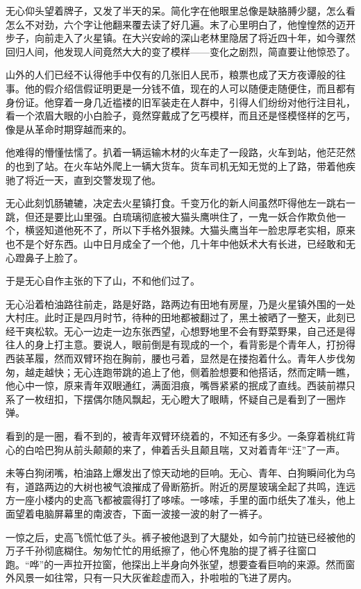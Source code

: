 无心仰头望着牌子，又发了半天的呆。简化字在他眼里总像是缺胳膊少腿，怎么看怎么不对劲，六个字让他翻来覆去读了好几遍。末了心里明白了，他惶惶然的迈开步子，向前走入了火星镇。在大兴安岭的深山老林里隐居了将近四十年，如今骤然回归人间，他发现人间竟然大大的变了模样——变化之剧烈，简直要让他惊恐了。

山外的人们已经不认得他手中仅有的几张旧人民币，粮票也成了天方夜谭般的往事。他的假介绍信假证明更是一分钱不值，现在的人可以随便走随便住，而且都有身份证。他穿着一身几近褴褛的旧军装走在人群中，引得人们纷纷对他行注目礼，看一个浓眉大眼的小白脸子，竟然穿戴成了乞丐模样，而且还是怪模怪样的乞丐，像是从革命时期穿越而来的。

他难得的懵懂怯懦了。扒着一辆运输木材的火车走了一段路，火车到站，他茫茫然的也到了站。在火车站外爬上一辆大货车。货车司机无知无觉的上了路，带着他疾驰了将近一天，直到交警发现了他。

无心此刻饥肠辘辘，决定去火星镇打食。千变万化的新人间虽然吓得他左一跳右一跳，但还是要比山里强。白琉璃彻底被大猫头鹰哄住了，一鬼一妖合作欺负他一个，横竖知道他死不了，所以下手格外狠辣。大猫头鹰当年一脸忠厚老实相，原来也不是个好东西。山中日月成全了一个他，几十年中他妖术大有长进，已经敢和无心蹬鼻子上脸了。

于是无心自作主张的下了山，不和他们过了。

无心沿着柏油路往前走，路是好路，路两边有田地有房屋，乃是火星镇外围的一处大村庄。此时正是四月时节，待种的田地都被翻过了，黑土被晒了一整天，此刻已经干爽松软。无心一边走一边东张西望，心想野地里不会有野菜野果，自己还是得往人的身上打主意。要说人，眼前倒是有现成的一个，看背影是个青年人，打扮得西装革履，然而双臂环抱在胸前，腰也弓着，显然是在搂抱着什么。青年人步伐匆匆，越走越快；无心连跑带跳的追上了他，侧着脸想要和他搭话，然而定睛一瞧，他心中一惊，原来青年双眼通红，满面泪痕，嘴唇紧紧的抿成了直线。西装前襟只系了一枚纽扣，下摆偶尔随风飘起，无心瞪大了眼睛，怀疑自己是看到了一圈炸弹。

看到的是一圈，看不到的，被青年双臂环绕着的，不知还有多少。一条穿着桃红背心的白哈巴狗从前头颠颠的来了，伸着舌头且颠且喘，又对着青年``汪''了一声。

未等白狗闭嘴，柏油路上爆发出了惊天动地的巨响。无心、青年、白狗瞬间化为乌有，道路两边的大树也被气浪摧成了骨断筋折。附近的房屋玻璃全起了共鸣，连远方一座小楼内的史高飞都被震得打了哆嗦。一哆嗦，手里的面巾纸失了准头，他上面望着电脑屏幕里的南波杏，下面一波接一波的射了一裤子。

一惊之后，史高飞慌忙低了头。裤子被他退到了大腿处，如今前门拉链已经被他的万子千孙彻底糊住。匆匆忙忙的用纸擦了，他心怀鬼胎的提了裤子往窗口跑。``哗''的一声拉开拉窗，他探出上半身向外张望，想要查看巨响的来源。然而窗外风景一如往常，只有一只大灰雀趁虚而入，扑啦啦的飞进了房内。

